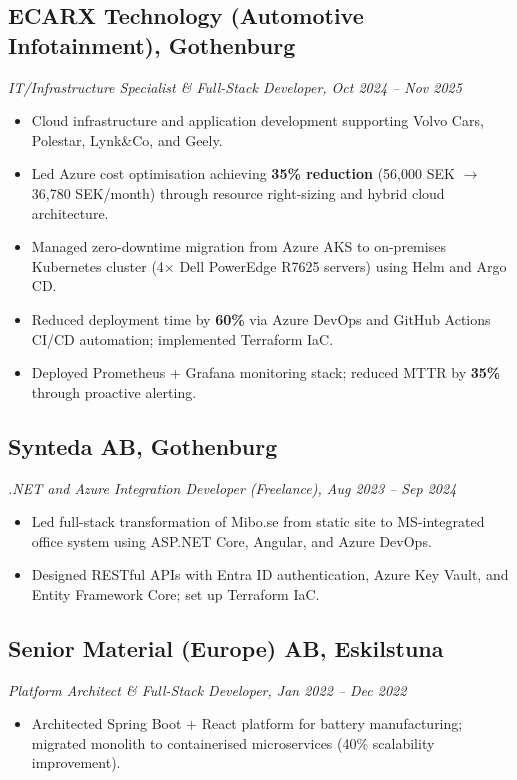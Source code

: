 \documentclass[a4paper,10pt]{article}
\begin{document}
\subsection*{ECARX Technology (Automotive Infotainment), Gothenburg}
\textit{IT/Infrastructure Specialist \& Full-Stack Developer, Oct 2024 -- Nov 2025}
\begin{itemize}[noitemsep]
  \item Cloud infrastructure and application development supporting Volvo Cars, Polestar, Lynk\&Co, and Geely.
  \item Led Azure cost optimisation achieving \textbf{35\% reduction} (56,000 SEK $\to$ 36,780 SEK/month) through resource right-sizing and hybrid cloud architecture.
  \item Managed zero-downtime migration from Azure AKS to on-premises Kubernetes cluster (4$\times$ Dell PowerEdge R7625 servers) using Helm and Argo CD.
  \item Reduced deployment time by \textbf{60\%} via Azure DevOps and GitHub Actions CI/CD automation; implemented Terraform IaC.
  \item Deployed Prometheus + Grafana monitoring stack; reduced MTTR by \textbf{35\%} through proactive alerting.
\end{itemize}

\subsection*{Synteda AB, Gothenburg}
\textit{.NET and Azure Integration Developer (Freelance), Aug 2023 -- Sep 2024}
\begin{itemize}[noitemsep]
  \item Led full-stack transformation of Mibo.se from static site to MS-integrated office system using ASP.NET Core, Angular, and Azure DevOps.
  \item Designed RESTful APIs with Entra ID authentication, Azure Key Vault, and Entity Framework Core; set up Terraform IaC.
\end{itemize}

\subsection*{Senior Material (Europe) AB, Eskilstuna}
\textit{Platform Architect \& Full-Stack Developer, Jan 2022 -- Dec 2022}
\begin{itemize}[noitemsep]
  \item Architected Spring Boot + React platform for battery manufacturing; migrated monolith to containerised microservices (40\% scalability improvement).
\end{itemize}
\end{document}
